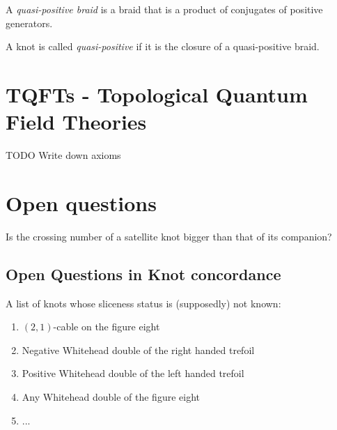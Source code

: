 \begin{definition}
	A \textit{quasi-positive braid} 
	is a braid that is a product of 
	conjugates of positive generators.
	
	A knot is called
	\textit{quasi-positive} 
	if it is the
	closure of a quasi-positive braid.
\end{definition}



\section{TQFTs - Topological Quantum Field Theories}


TODO Write down axioms





\section{Open questions}

\begin{openquestion}
	Is the crossing number of a satellite knot bigger than that of its companion?
\end{openquestion}



\subsection{Open Questions in Knot concordance}

A list of knots whose sliceness status is (supposedly) not known:
\begin{enumerate}
	\item $(2, 1)$-cable on the figure eight
	\item Negative Whitehead double of the right handed trefoil
	\item Positive Whitehead double of the left handed trefoil
	\item Any Whitehead double of the figure eight
	\item ...
\end{enumerate}


